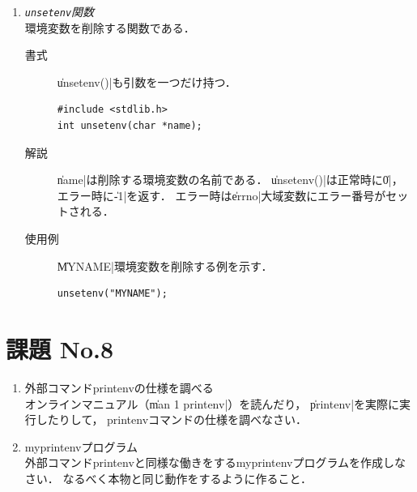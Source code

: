 \begin{enumerate}
\begin{description}
  \item [使用例]
    前出の\|setenv()|の使用例と同じことを\|putenv()|を用いて行う例を示す．

\begin{lstlisting}[numbers=none]
putenv("MYNAME=sigemura");
\end{lstlisting}

  \end{description}

\item \emph{\texttt{unsetenv}関数} \\
  環境変数を削除する関数である．

  \begin{description}
  \item [書式]  \|unsetenv()|も引数を一つだけ持つ．

\begin{lstlisting}[numbers=none]
#include <stdlib.h>
int unsetenv(char *name);
\end{lstlisting}

  \item [解説] \|name|は削除する環境変数の名前である．
    \|unsetenv()|は正常時に\|0|，エラー時に\|-1|を返す．
    エラー時は\|errno|大域変数にエラー番号がセットされる．

  \item [使用例] \|MYNAME|環境変数を削除する例を示す．

\begin{lstlisting}[numbers=none]
unsetenv("MYNAME");
\end{lstlisting}

  \end{description}
\end{enumerate}



\section*{課題 No.8}
\begin{enumerate}
\item 外部コマンドprintenvの仕様を調べる \\
  オンラインマニュアル（\|man 1 printenv|）を読んだり，
  \|printenv|を実際に実行したりして，
  printenvコマンドの仕様を調べなさい．
\item myprintenvプログラム\\
  外部コマンドprintenvと同様な働きをするmyprintenvプログラムを作成しなさい．
  なるべく本物と同じ動作をするように作ること．
\end{enumerate}
 
